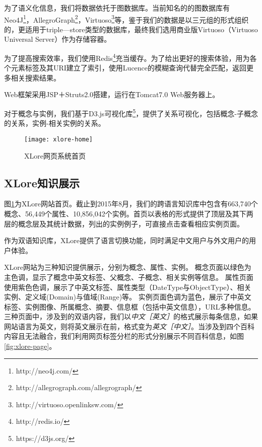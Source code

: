 为了语义化信息，我们将数据依托于图数据库。当前知名的的图数据库有Neo4J\footnote{http://neo4j.com/}，AllegroGraph\footnote{http://allegrograph.com/allegrograph/}，Virtuoso\footnote{http://virtuoso.openlinksw.com/}等，鉴于我们的数据是以三元组的形式组织的，更适用于triple—store类型的数据库，最终我们选用商业版Virtuoso（Virtuoso Universal Server）作为存储容器。


为了提高搜索效率，我们使用Redis\footnote{http://redis.io/}充当缓存。为了给出更好的搜索体验，用为各个元素标签及其URI建立了索引，使用Lucence的模糊查询代替完全匹配，返回更多相关搜索结果。

Web框架采用JSP＋Struts2.0搭建，运行在Tomcat7.0 Web服务器上。

对于概念与实例，我们基于D3.js可视化库\footnote{https://d3js.org/}，提供了关系可视化，包括概念-子概念的关系，实例-相关实例的关系。

\begin{figure}[H]
  \centering
  \texttt{[image: xlore-home]}
  \caption{XLore网页系统首页}
  \label{fig:xlore-home}
\end{figure}

\subsection{XLore知识展示}
图\ref{fig:xlore-home}为XLore网站首页。截止到2015年8月，我们的跨语言知识库中包含有663,740个概念、56,449个属性、10,856,042个实例。首页以表格的形式提供了顶层及其下两层的概念层及其统计数据，列出的实例例子，可直接点击查看相应实例页面。


作为双语知识库，XLore提供了语言切换功能，同时满足中文用户与外文用户的用户体验。

XLore网站为三种知识提供展示，分别为概念、属性、实例。
概念页面以绿色为主色调，显示了概念中英文标签、父概念、子概念、相关实例等信息。
属性页面使用紫色色调，展示了中英文标签、属性类型（DateType与ObjectType）、相关实例、定义域(Domain)与值域(Range)等。
实例页面色调为蓝色，展示了中英文标签、实例图像、所属概念、摘要、信息框（包括中英文信息），URL多种信息。三种页面中，涉及到的双语内容，我们以\textit{中文［英文］}的格式展示每条信息，如果网站语言为英文，则将英文展示在前，格式变为\textit{英文［中文］}。当涉及到四个百科内容且无法融合，我们利用网页标签分栏的形式分别展示不同百科信息，如图\ref{fig:xlore-page}。

